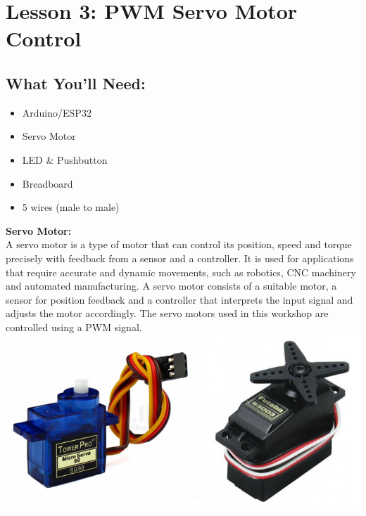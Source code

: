 \documentclass[a4paper,12pt]{report}
\begin{document}
\newpage

\section*{Lesson 3: PWM Servo Motor Control}
    \subsection*{What You'll Need:}
            \begin{itemize}
                \item Arduino/ESP32
                \item Servo Motor
                \item LED \& Pushbutton
                \item Breadboard
                \item 5 wires (male to male)
            \end{itemize}
        \begin{mdframed}[linewidth = 3, linecolor = turbo_purple]
            \textbf{Servo Motor:}
            \\
            A servo motor is a type of motor that can control its position, speed and torque precisely 
            with feedback from a sensor and a controller. It is used for applications that require accurate 
            and dynamic movements, such as robotics, CNC machinery and automated manufacturing. A servo motor 
            consists of a suitable motor, a sensor for position feedback and a controller that interprets the 
            input signal and adjusts the motor accordingly.            
            The servo motors used in this workshop are controlled using a PWM signal.
            \\
            \includegraphics[scale = 1]{Assets/servos.png}
        \end{mdframed}
\end{document}

